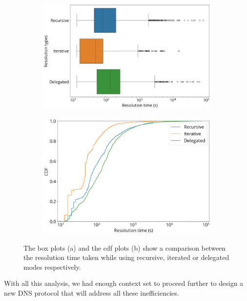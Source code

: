 \documentclass[conference]{IEEEtran}
\begin{document}
\begin{figure}[htbp]
    \centering
    \begin{subfigure}[b]{1\linewidth}
        \centering
        \includegraphics[width=\linewidth]{images/delegation-box.png}
        \caption{}
    \end{subfigure}
    \begin{subfigure}[b]{1\linewidth}
        \centering
        \includegraphics[width=\linewidth]{images/delegation-cdf.png}
        \caption{}
    \end{subfigure}
    \caption{The box plots (a) and the cdf plots (b) show a comparison between the resolution time taken while using recursive, iterated or delegated modes respectively.}
    \label{fig:delegation}
\end{figure}

With all this analysis, we had enough context set to proceed further to design a new DNS protocol that will address all these inefficiencies.
\end{document}

